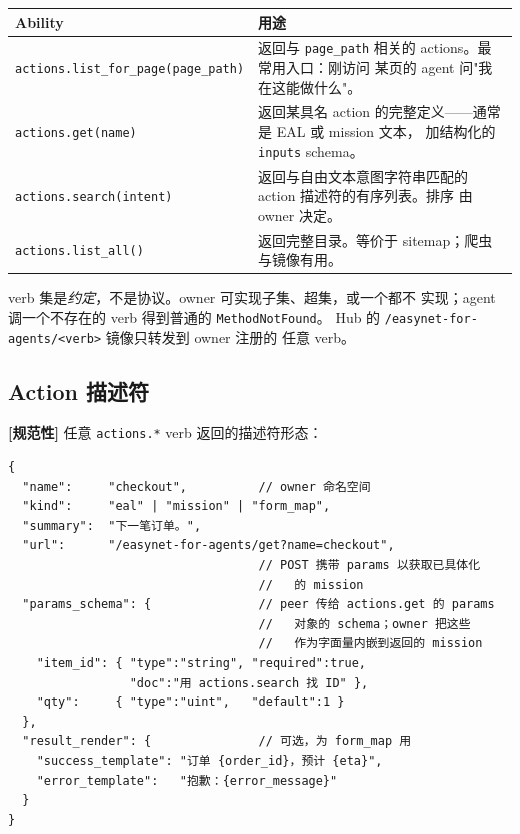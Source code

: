 \documentclass[11pt,a4paper]{article}
\newcommand{\normsv}{\textcolor{normativecolor}{\textbf{[规范性]}}\xspace}
\theoremstyle{definition}
\begin{document}
\begin{center}
\renewcommand{\arraystretch}{1.25}
\begin{tabularx}{\linewidth}{l X}
\toprule
\textbf{Ability} & \textbf{用途} \\
\midrule
\texttt{actions.list\_for\_page(page\_path)}
    & 返回与 \texttt{page\_path} 相关的 actions。最常用入口：刚访问
      某页的 agent 问"我在这能做什么"。 \\
\texttt{actions.get(name)}
    & 返回某具名 action 的完整定义——通常是 EAL 或 mission 文本，
      加结构化的 \texttt{inputs} schema。 \\
\texttt{actions.search(intent)}
    & 返回与自由文本意图字符串匹配的 action 描述符的有序列表。排序
      由 owner 决定。 \\
\texttt{actions.list\_all()}
    & 返回完整目录。等价于 sitemap；爬虫与镜像有用。 \\
\bottomrule
\end{tabularx}
\end{center}

verb 集是\emph{约定}，不是协议。owner 可实现子集、超集，或一个都不
实现；agent 调一个不存在的 verb 得到普通的 \texttt{MethodNotFound}。
Hub 的 \texttt{/easynet-for-agents/<verb>} 镜像只转发到 owner 注册的
任意 verb。

\subsection{Action 描述符}

\normsv{} 任意 \texttt{actions.*} verb 返回的描述符形态：

\begin{lstlisting}
{
  "name":     "checkout",          // owner 命名空间
  "kind":     "eal" | "mission" | "form_map",
  "summary":  "下一笔订单。",
  "url":      "/easynet-for-agents/get?name=checkout",
                                   // POST 携带 params 以获取已具体化
                                   //   的 mission
  "params_schema": {               // peer 传给 actions.get 的 params
                                   //   对象的 schema；owner 把这些
                                   //   作为字面量内嵌到返回的 mission
    "item_id": { "type":"string", "required":true,
                 "doc":"用 actions.search 找 ID" },
    "qty":     { "type":"uint",   "default":1 }
  },
  "result_render": {               // 可选，为 form_map 用
    "success_template": "订单 {order_id}，预计 {eta}",
    "error_template":   "抱歉：{error_message}"
  }
}
\end{lstlisting}
\end{document}
